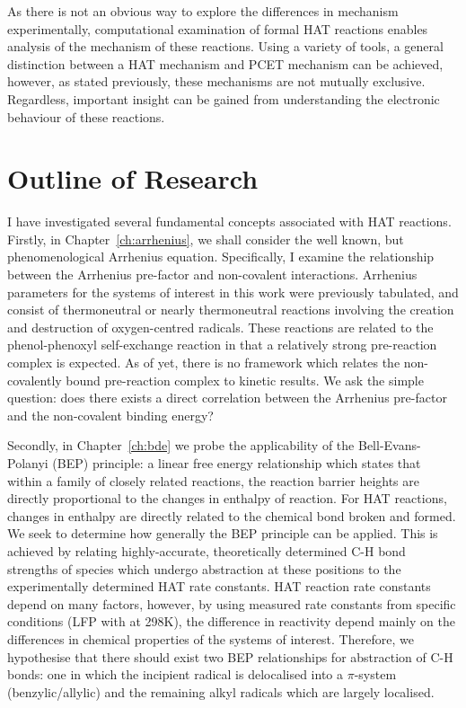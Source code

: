 As there is not an obvious way to explore the differences in mechanism experimentally, computational examination of formal HAT reactions enables analysis of the mechanism of these reactions. Using a variety of tools, a general distinction between a HAT mechanism and PCET mechanism can be achieved, however, as stated previously, these mechanisms are not mutually exclusive. Regardless, important insight can be gained from understanding the electronic behaviour of these reactions.

\section{Outline of Research}

I have investigated several fundamental concepts associated with HAT reactions. Firstly, in Chapter~\ref{ch:arrhenius}, we shall consider the well known, but phenomenological Arrhenius equation. Specifically, I examine the relationship between the Arrhenius pre-factor and non-covalent interactions. Arrhenius parameters for the systems of interest in this work were previously tabulated,\cite{DiLabio2005} and consist of thermoneutral or nearly thermoneutral reactions involving the creation and destruction of oxygen-centred radicals. These reactions are related to the phenol-phenoxyl self-exchange reaction in that a relatively strong pre-reaction complex is expected. As of yet, there is no framework which relates the non-covalently bound pre-reaction complex to kinetic results. We ask the simple question: does there exists a direct correlation between the Arrhenius pre-factor and the non-covalent binding energy?

Secondly, in Chapter~\ref{ch:bde} we probe the applicability of the Bell-Evans-Polanyi (BEP) principle: a linear free energy relationship which states that within a family of closely related reactions, the reaction barrier heights are directly proportional to the changes in enthalpy of reaction. For HAT reactions, changes in enthalpy are directly related to the chemical bond broken and formed. We seek to determine how generally the BEP principle can be applied. This is achieved by relating highly-accurate, theoretically determined C-H bond strengths of species which undergo abstraction at these positions to the experimentally determined HAT rate constants. HAT reaction rate constants depend on many factors, however, by using measured rate constants from specific conditions (LFP with \cumo at 298K), the difference in reactivity depend mainly on the differences in chemical properties of the systems of interest. Therefore, we hypothesise that there should exist two BEP relationships for abstraction of C-H bonds: one in which the incipient radical is delocalised into a $\pi$-system (benzylic/allylic) and the remaining alkyl radicals which are largely localised.

